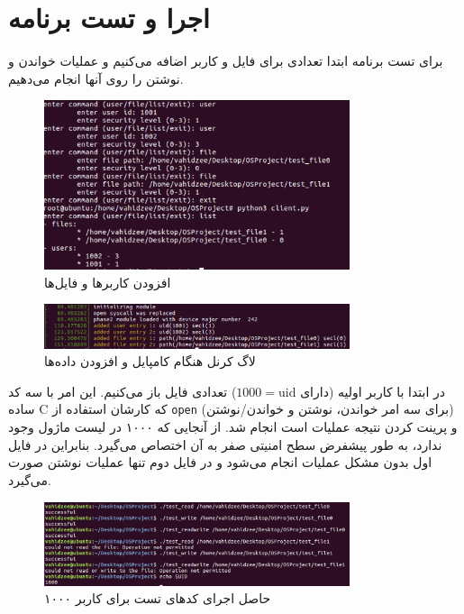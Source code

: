 \documentclass[13pt]{article}
\begin{document}
      \section{اجرا و تست برنامه}
      برای تست برنامه ابتدا تعدادی 
      برای فایل و کاربر اضافه می‌کنیم و عملیات خواندن و نوشتن را روی آنها انجام می‌دهیم.
      \begin{figure}[h]
      	\centering
      	\includegraphics[width=0.8\textwidth]{screenshots/testFilesAndUsers.png}
      	\caption{افزودن کاربرها و فایل‌ها}
      \end{figure}
   \begin{figure}[h]
  	\centering
  	\includegraphics[width=0.8\textwidth]{screenshots/testFilesAndUsersAddedLog.png}
  	\caption{لاگ کرنل هنگام کامپایل و افزودن داده‌ها}
  \end{figure}

	در ابتدا با کاربر اولیه (دارای $1000 = \mathrm{uid}$) تعدادی فایل باز می‌کنیم. این امر با سه کد ساده C که کارشان استفاده از \texttt{open} (برای سه امر خواندن، نوشتن و خواندن/نوشتن) و پرینت کردن نتیجه عملیات است انجام شد. از آنجایی که ۱۰۰۰ در لیست ماژول وجود ندارد، به طور پیشفرض سطح امنیتی صفر به آن اختصاص می‌گیرد. بنابراین در فایل اول بدون مشکل عملیات انجام می‌شود و در فایل دوم تنها عملیات نوشتن صورت می‌گیرد.
	\begin{figure}[h]
		\centering
		\includegraphics[width=0.8\textwidth]{screenshots/user(0)-cmds.png}
		\caption{حاصل اجرای کدهای تست برای کاربر ۱۰۰۰}
	\end{figure}
\end{document}

